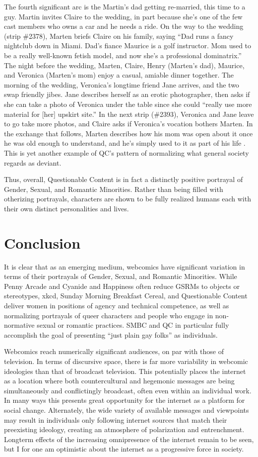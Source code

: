 \documentclass[man,12pt]{apa6}
\begin{document}
The fourth significant arc is the Martin's dad getting re-married, this time to a guy. Martin invites Claire to the wedding, in part because she's one of the few cast members who owns a car and he needs a ride. On the way to the wedding (strip \#2378), Marten briefs Claire on his family, saying ``Dad runs a fancy nightclub down in Miami. Dad's fiance Maurice is a golf instructor. Mom used to be a really well-known fetish model, and now she's a professional dominatrix.'' The night before the wedding, Marten, Claire, Henry (Marten's dad), Maurice, and Veronica (Marten's mom) enjoy a casual, amiable dinner together. The morning of the wedding, Veronica's longtime friend Jane arrives, and the two swap friendly jibes. Jane describes herself as an erotic photographer, then asks if she can take a photo of Veronica under the table since she could ``really use more material for [her] upskirt site.'' In the next strip (\#2393), Veronica and Jane leave to go take more photos, and Claire asks if Veronica's vocation bothers Marten. In the exchange that follows, Marten describes how his mom was open about it once he was old enough to understand, and he's simply used to it as part of his life \cite{qc}. This is yet another example of QC's pattern of normalizing what general society regards as deviant. 

Thus, overall, Questionable Content is in fact a distinctly positive portrayal of Gender, Sexual, and Romantic Minorities. Rather than being filled with otherizing portrayals, characters are shown to be fully realized humans each with their own distinct personalities and lives. 
\section{Conclusion}
It is clear that as an emerging medium, webcomics have significant variation in terms of their portrayals of Gender, Sexual, and Romantic Minorities. While Penny Arcade and Cyanide and Happiness often reduce GSRMs to objects or stereotypes, xkcd, Sunday Morning Breakfast Cereal, and Questionable Content deliver women in positions of agency and technical competence, as well as normalizing portrayals of queer characters and people who engage in non-normative sexual or romantic practices. SMBC and QC in particular fully accomplish the goal of presenting ``just plain gay folks'' as individuals. 

Webcomics reach numerically significant audiences, on par with those of television. In terms of discursive space, there is far more variability in webcomic ideologies than that of broadcast television. This potentially places the internet as a location where both countercultural and hegemonic messages are being simultaneously and conflictingly broadcast, often even within an individual work. In many ways this presents great opportunity for the internet as a platform for social change. Alternately, the wide variety of available messages and viewpoints may result in individuals only following internet sources that match their preexisting ideology, creating an atmosphere of polarization and entrenchment. Longterm effects of the increasing omnipresence of the internet remain to be seen, but I for one am optimistic about the internet as a progressive force in society.
\end{document}
